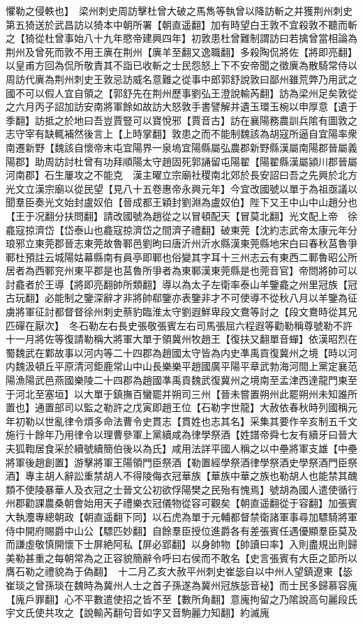 懼勒之侵軼也】　梁州刺史周訪擊杜曾大破之馬雋等執曾以降訪斬之并獲荆州刺史第五猗送於武昌訪以猗本中朝所署【朝直遥翻】加有時望白王敦不宜殺敦不聽而斬之【猗從杜曾事始八十九年愍帝建興四年】初敦患杜曾難制謂訪曰若擒曾當相論為荆州及曾死而敦不用王廙在荆州【廙羊至翻又逸職翻】多殺陶侃將佐【將即亮翻】以皇甫方回為侃所敬責其不詣已收斬之士民怨怒上下不安帝聞之徵廙為散騎常侍以周訪代廙為荆州刺史王敦忌訪威名意難之從事中郎郭舒說敦曰鄙州雖荒弊乃用武之國不可以假人宜自領之【郭舒先在荆州歷事劉弘王澄說輸芮翻】訪為梁州足矣敦從之六月丙子詔加訪安南將軍餘如故訪大怒敦手書譬解并遺玉環玉椀以申厚意【遺于季翻】訪抵之於地曰吾豈賈豎可以寶悅邪【賈音古】訪在襄陽務農訓兵隂有圖敦之志守宰有缺輒補然後言上【上時掌翻】敦患之而不能制魏該為胡寇所逼自宜陽率衆南遷新野【魏該自懷帝末屯宜陽界一泉塢宜陽縣屬弘農郡新野縣漢屬南陽郡晉屬義陽郡】助周訪討杜曾有功拜順陽太守趙固死郭誦留屯陽翟【陽翟縣漢屬潁川郡晉屬河南郡】石生屢攻之不能克　漢主曜立宗廟社稷南北郊於長安詔曰吾之先興於北方光文立漢宗廟以從民望【見八十五卷惠帝永興元年】今宜改國號以單于為祖亟議以聞羣臣奏光文始封盧奴伯【晉成都王穎封劉淵為盧奴伯】陛下又王中山中山趙分也【王于况翻分扶問翻】請改國號為趙從之以冒頓配天【冒莫北翻】光文配上帝　徐龕寇掠濟岱【岱泰山也龕寇掠濟岱之間濟子禮翻】破東莞【沈約志武帝太康元年分琅邪立東莞郡晉志東莞故魯鄆邑劉昫曰唐沂州沂水縣漢東莞縣地宋白曰春秋莒魯爭鄆杜預註云城陽姑幕縣南有員亭即鄆也俗變其字耳十三州志云有東西二鄆魯昭公所居者為西鄆兖州東平郡是也莒魯所爭者為東鄆漢東莞縣是也莞音官】帝問將帥可以討龕者於王導【將即亮翻帥所類翻】導以為太子左衛率泰山羊鑒龕之州里冠族【冠古玩翻】必能制之鑒深辭才非將帥郗鑒亦表鑒非才不可使導不從秋八月以羊鑒為征虜將軍征討都督督徐州刺史蔡豹臨淮太守劉遐鮮卑段文鴦等討之【段文鴦時從其兄匹磾在厭次】　冬石勒左右長史張敬張賓左右司馬張屈六程遐等勸勒稱尊號勒不許十一月將佐等復請勒稱大將軍大單于領冀州牧趙王【復扶又翻單音蟬】依漢昭烈在蜀魏武在鄴故事以河内等二十四郡為趙國太守皆為内史凖禹貢復冀州之境【時以河内魏汲頓丘平原清河鉅鹿常山中山長樂樂平趙國廣平陽平章武勃海河間上黨定襄范陽漁陽武邑燕國樂陵二十四郡為趙國凖禹貢魏武復冀州之境南至孟津西達龍門東至于河北至塞垣】以大單于鎮撫百蠻罷并朔司三州【晉未嘗置朔州此罷朔州未知誰所置也】通置部司以監之勒許之戊寅即趙王位【石勒字世龍】大赦依春秋時列國稱元年初勒以世亂律令煩多命法曹令史貫志【貫姓也志其名】采集其要作辛亥制五千文施行十餘年乃用律令以理曹參軍上黨續咸為律學祭酒【姓譜帝舜七友有續牙曰晉大夫狐鞫居食采於續號續簡伯後以為氏】咸用法詳平國人稱之以中壘將軍支雄【中壘將軍後趙創置】游擊將軍王陽領門臣祭酒【勒置經學祭酒律學祭酒史學祭酒門臣祭酒】專主胡人辭訟重禁胡人不得陵侮衣冠華族【華族中華之族也勒胡人也能禁其醜類不使陵暴華人及衣冠之士晉文公初欲俘陽樊之民殆有愧焉】號胡為國人遣使循行州郡勸課農桑朝會始用天子禮樂衣冠儀物從容可觀矣【朝直遥翻從于容翻】加張賓大執灋專總朝政【朝直遥翻下同】以石虎為單于元輔都督禁衛諸軍事尋加驃騎將軍侍中開府賜爵中山公【驃匹妙翻】自餘羣臣授位進爵各有差張賓任遇優顯羣臣莫及而謙虛敬慎開懷下士屏絶阿私【屏必郢翻】以身帥物【帥讀曰率】入則盡規出則歸美勒甚重之每朝常為之正容貌簡辭令呼曰右侯而不敢名【史言張賓有大臣之節所以膺石勒之禮貌為于偽翻】　十二月乙亥大赦平州刺史崔毖自以中州人望鎮遼東【毖崔琰之曾孫琰在魏時為冀州人士之首子孫遂為冀州冠族毖音袐】而士民多歸慕容廆【廆戶罪翻】心不平數遣使招之皆不至【數所角翻】意廆拘留之乃隂說高句麗段氏宇文氏使共攻之【說輸芮翻句音如字又音駒麗力知翻】約滅廆